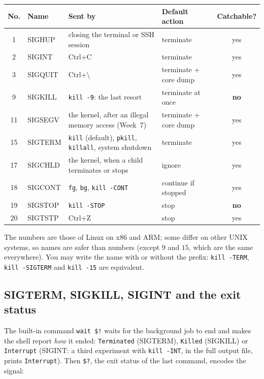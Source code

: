 \documentclass[11pt,a4paper]{article}
\newcommand{\cmd}[1]{\texttt{#1}}
\begin{document}
\begin{center}
\renewcommand{\arraystretch}{1.25}
\begin{tabularx}{\linewidth}{c >{\ttfamily}l >{\raggedright\arraybackslash}X >{\raggedright\arraybackslash}p{3.2cm} c}
\toprule
\textbf{No.} & \textbf{\rmfamily Name} & \textbf{Sent by} & \textbf{Default action} & \textbf{Catchable?}\\
\midrule
1 & SIGHUP & closing the terminal or SSH session & terminate & yes\\
2 & SIGINT & Ctrl+C & terminate & yes\\
3 & SIGQUIT & Ctrl+\textbackslash & terminate + core dump & yes\\
9 & SIGKILL & \cmd{kill -9}: the last resort & terminate at once & \textbf{no}\\
11 & SIGSEGV & the kernel, after an illegal memory access (Week~7) & terminate + core dump & yes\\
15 & SIGTERM & \cmd{kill} (default), \cmd{pkill}, \cmd{killall}, system shutdown & terminate & yes\\
17 & SIGCHLD & the kernel, when a child terminates or stops & ignore & yes\\
18 & SIGCONT & \cmd{fg}, \cmd{bg}, \cmd{kill -CONT} & continue if stopped & yes\\
19 & SIGSTOP & \cmd{kill -STOP} & stop & \textbf{no}\\
20 & SIGTSTP & Ctrl+Z & stop & yes\\
\bottomrule
\end{tabularx}
\end{center}
The numbers are those of Linux on x86 and ARM; some differ on other UNIX systems, so names are safer than numbers (except $9$ and $15$, which are the same everywhere). You may write the name with or without the prefix: \cmd{kill -TERM}, \cmd{kill -SIGTERM} and \cmd{kill -15} are equivalent.

\subsection{SIGTERM, SIGKILL, SIGINT and the exit status}



The built-in command \cmd{wait \$!} waits for the background job to end and makes the shell report \emph{how} it ended: \texttt{Terminated} (SIGTERM), \texttt{Killed} (SIGKILL) or \texttt{Interrupt} (SIGINT: a third experiment with \cmd{kill -INT}, in the full output file, prints \texttt{Interrupt}). Then \verb|$?|, the exit status of the last command, encodes the signal:
\end{document}
